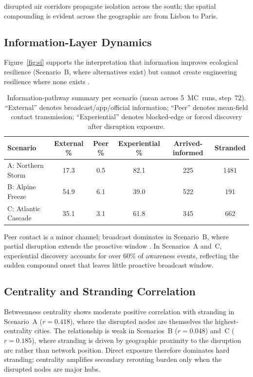 \documentclass[12pt,a4paper]{article}
\begin{document}
disrupted air corridors propagate isolation across the south; the spatial compounding
\citep{Zscheischler2020} is evident across the geographic arc from Lisbon to Paris.

\subsection{Information-Layer Dynamics}

Figure~\ref{fig:si} supports the interpretation that information improves ecological resilience (Scenario~B, where alternatives exist) but cannot create engineering resilience where none exists \citep{Reggiani2015, Leng2020, Cats2014}.

\begin{table}[h]
\centering
\caption{Information-pathway summary per scenario (mean across 5~MC~runs, step~72).
         ``External'' denotes broadcast/app/official information;
         ``Peer'' denotes mean-field contact transmission;
         ``Experiential'' denotes blocked-edge or forced discovery after disruption exposure.}
\label{tab:pathways}
\small
\begin{tabular}{lccccc}
\toprule
Scenario & External \% & Peer \% & Experiential \% & Arrived-informed & Stranded \\
\midrule
A: Northern Storm   & 17.3 & 0.5 & 82.1 & 225 & 1481 \\
B: Alpine Freeze    & 54.9 & 6.1 & 39.0 & 522 &  191 \\
C: Atlantic Cascade & 35.1 & 3.1 & 61.8 & 345 &  662 \\
\bottomrule
\end{tabular}
\end{table}

Peer contact is a minor channel; broadcast dominates in Scenario~B, where partial disruption extends the proactive window \citep{Leng2020}.
In Scenarios~A and~C, experiential discovery accounts for over 60\% of awareness events, reflecting the sudden compound onset that leaves little proactive broadcast window.


\subsection{Centrality and Stranding Correlation}

Betweenness centrality shows moderate positive correlation with stranding in Scenario~A ($r = 0.418$), where the disrupted nodes are themselves the highest-centrality cities.
The relationship is weak in Scenarios~B ($r = 0.048$) and~C ($r = 0.185$), where stranding is driven by geographic proximity to the disruption arc rather than network position.
Direct exposure therefore dominates hard stranding; centrality amplifies secondary rerouting burden only when the disrupted nodes are major hubs.
\end{document}
